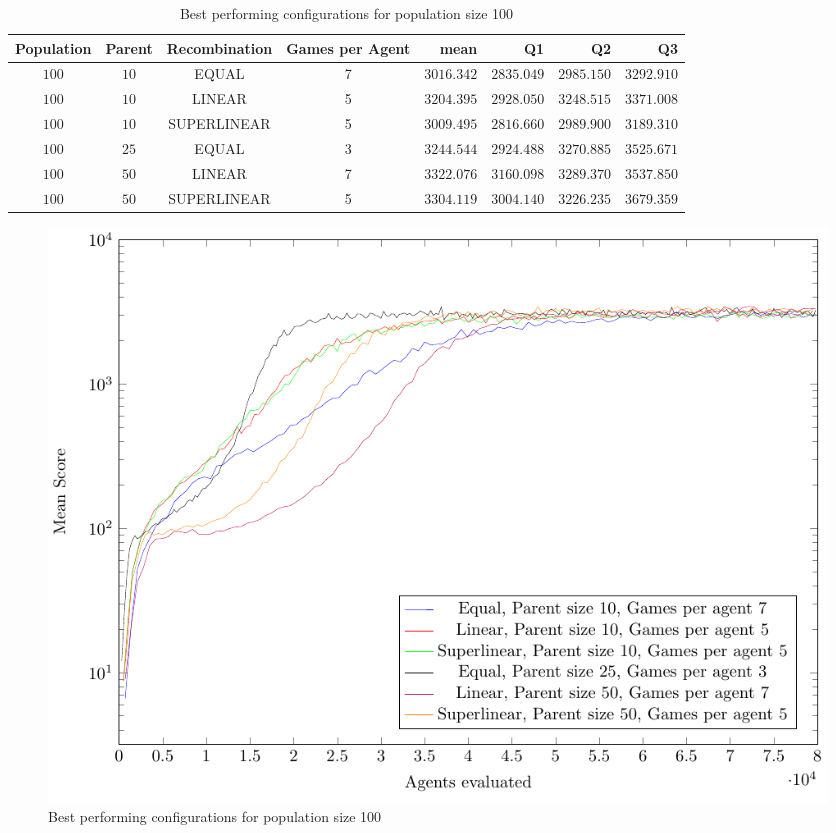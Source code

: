 \begin{table}[H]
\centering
\small
\begin{tabular}{c c c c r r r r}
Population & Parent & Recombination & Games per Agent & mean & Q1 & Q2 & Q3\\
\hline
$100$ & $10$ & EQUAL & 7 & $3016.342$ & $2835.049$ & $2985.150$ & $3292.910$\\
$100$ & $10$ & LINEAR & 5 & $3204.395$ & $2928.050$ & $3248.515$ & $3371.008$\\
$100$ & $10$ & SUPERLINEAR & 5 & $3009.495$ & $2816.660$ & $2989.900$ & $3189.310$\\
$100$ & $25$ & EQUAL & 3 & $3244.544$ & $2924.488$ & $3270.885$ & $3525.671$\\
$100$ & $50$ & LINEAR & 7 & $3322.076$ & $3160.098$ & $3289.370$ & $3537.850$\\
$100$ & $50$ & SUPERLINEAR & 5 & $3304.119$ & $3004.140$ & $3226.235$ & $3679.359$\\
\end{tabular}
\caption{Best performing configurations for population size 100}
\end{table}

\begin{figure}[H]
\centering
\caption{Best performing configurations for population size 100}
\includegraphics[scale=1]{data/cma_population_offspring/bestofeach_population/100x/PlotFile.pdf}
\end{figure}

\clearpage 

